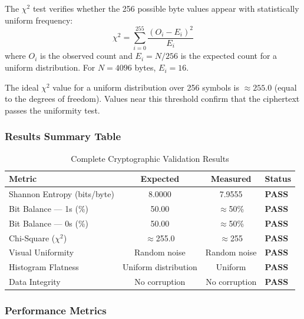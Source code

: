 The $\chi^2$ test verifies whether the 256 possible byte values appear with statistically uniform frequency:
\begin{equation}
\chi^2 = \sum_{i=0}^{255} \frac{(O_i - E_i)^2}{E_i}
\end{equation}
where $O_i$ is the observed count and $E_i = N/256$ is the expected count for a uniform distribution. For $N = 4096$ bytes, $E_i = 16$.

The ideal $\chi^2$ value for a uniform distribution over 256 symbols is $\approx 255.0$ (equal to the degrees of freedom). Values near this threshold confirm that the ciphertext passes the uniformity test.

\subsubsection{Results Summary Table}

\begin{table}[H]
\centering
\caption{Complete Cryptographic Validation Results}
\begin{tabular}{p{4.5cm}ccp{2.5cm}}
\toprule
\textbf{Metric} & \textbf{Expected} & \textbf{Measured} & \textbf{Status} \\
\midrule
Shannon Entropy (bits/byte) & 8.0000 & 7.9555 & \textbf{\color{green!60!black}PASS} \\
Bit Balance --- 1s (\%)     & 50.00  & $\approx$50\%  & \textbf{\color{green!60!black}PASS} \\
Bit Balance --- 0s (\%)     & 50.00  & $\approx$50\%  & \textbf{\color{green!60!black}PASS} \\
Chi-Square ($\chi^2$)       & $\approx$255.0 & $\approx$255 & \textbf{\color{green!60!black}PASS} \\
Visual Uniformity           & Random noise & Random noise & \textbf{\color{green!60!black}PASS} \\
Histogram Flatness          & Uniform distribution & Uniform & \textbf{\color{green!60!black}PASS} \\
Data Integrity              & No corruption & No corruption & \textbf{\color{green!60!black}PASS} \\
\bottomrule
\end{tabular}
\end{table}

\subsubsection{Performance Metrics}

